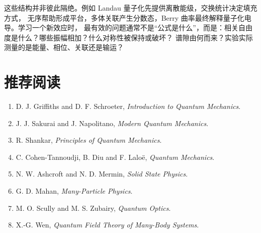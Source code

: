 \documentclass[12pt,a4paper,openany,fontset=fandol]{ctexrep}
\begin{document}
这些结构并非彼此隔绝。例如 Landau 量子化先提供离散能级，交换统计决定填充方式，
无序帮助形成平台，多体关联产生分数态，Berry 曲率最终解释量子化电导。学习一个新效应时，
最有效的问题通常不是“公式是什么”，而是：相关自由度是什么？哪些振幅相加？什么对称性被保持或破坏？
谱隙由何而来？实验实际测量的是能量、相位、关联还是输运？

\chapter*{推荐阅读}
\begin{enumerate}
\item D. J. Griffiths and D. F. Schroeter, \emph{Introduction to Quantum Mechanics}.
\item J. J. Sakurai and J. Napolitano, \emph{Modern Quantum Mechanics}.
\item R. Shankar, \emph{Principles of Quantum Mechanics}.
\item C. Cohen-Tannoudji, B. Diu and F. Laloë, \emph{Quantum Mechanics}.
\item N. W. Ashcroft and N. D. Mermin, \emph{Solid State Physics}.
\item G. D. Mahan, \emph{Many-Particle Physics}.
\item M. O. Scully and M. S. Zubairy, \emph{Quantum Optics}.
\item X.-G. Wen, \emph{Quantum Field Theory of Many-Body Systems}.
\end{enumerate}
\end{document}
